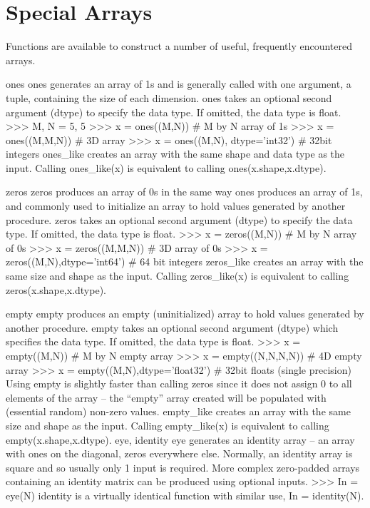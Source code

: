 \section*{Special Arrays}
Functions are available to construct a number of useful, frequently encountered arrays.

ones
ones generates an array of 1s and is generally called with one argument, a tuple, containing the size of
each dimension. ones takes an optional second argument (dtype) to specify the data type. If omitted, the
data type is float.
>>> M, N = 5, 5
>>> x = ones((M,N)) # M by N array of 1s
>>> x = ones((M,M,N)) # 3D array
>>> x = ones((M,N), dtype=’int32’) # 32bit integers
ones_like creates an array with the same shape and data type as the input. Calling ones_like(x) is equivalent
to calling ones(x.shape,x.dtype).

zeros
zeros produces an array of 0s in the same way ones produces an array of 1s, and commonly used to initialize
an array to hold values generated by another procedure. zeros takes an optional second argument
(dtype) to specify the data type. If omitted, the data type is float.
>>> x = zeros((M,N)) # M by N array of 0s
>>> x = zeros((M,M,N)) # 3D array of 0s
>>> x = zeros((M,N),dtype=’int64’) # 64 bit integers
zeros_like creates an array with the same size and shape as the input. Calling zeros_like(x) is equivalent
to calling zeros(x.shape,x.dtype).

empty
empty produces an empty (uninitialized) array to hold values generated by another procedure. empty takes
an optional second argument (dtype) which specifies the data type. If omitted, the data type is float.
>>> x = empty((M,N)) # M by N empty array
>>> x = empty((N,N,N,N)) # 4D empty array
>>> x = empty((M,N),dtype=’float32’) # 32bit
floats (single precision)
Using empty is slightly faster than calling zeros since it does not assign 0 to all elements of the array –
the “empty” array created will be populated with (essential random) non-zero values. empty_like creates
an array with the same size and shape as the input. Calling empty_like(x) is equivalent to calling
empty(x.shape,x.dtype).
eye, identity
eye generates an identity array – an array with ones on the diagonal, zeros everywhere else. Normally,
an identity array is square and so usually only 1 input is required. More complex zero-padded arrays
containing an identity matrix can be produced using optional inputs.
>>> In = eye(N)
identity is a virtually identical function with similar use, In = identity(N).


